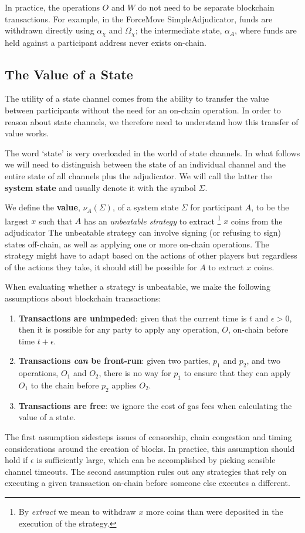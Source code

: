 \documentclass{article}
\begin{document}
In practice, the operations $O$ and $W$ do not need to be separate blockchain transactions.
For example, in the ForceMove SimpleAdjudicator, funds are withdrawn directly using $\alpha_\chi$ and $\Omega_\chi$;
the intermediate state, $\alpha_A$, where funds are held against a participant address never exists on-chain.

\subsection{The Value of a State}\label{section:value-of-a-state}

The utility of a state channel comes from the ability to transfer the value
between participants without the need for an on-chain operation.
In order to reason about state channels, we therefore need to understand how this transfer
of value works.

The word `state' is very overloaded in the world of state channels.
In what follows we will need to distinguish between the state of an individual channel and
the entire state of all channels plus the adjudicator.
We will call the latter the \textbf{system state} and usually denote it with the symbol $\Sigma$.

We define the \textbf{value}, $\nu_A(\Sigma)$, of a system state $\Sigma$ for participant $A$,
to be the largest $x$ such that $A$ has an \textit{unbeatable strategy} to extract
\footnote{By \textit{extract} we mean to withdraw $x$ more coins than were deposited in the execution of the strategy.}
$x$ coins from the adjudicator
The unbeatable strategy can involve signing (or refusing to sign) states off-chain, as well as
applying one or more on-chain operations.
The strategy might have to adapt based on the actions of other players but regardless of
the actions they take, it should still be possible for $A$ to extract $x$ coins.

When evaluating whether a strategy is unbeatable, we make the following assumptions about blockchain transactions:
\begin{enumerate}
  \item \textbf{Transactions are unimpeded}: given that the current time is $t$ and $\epsilon > 0$, then it is possible for any party to apply any operation, $O$, on-chain before time $t + \epsilon$.
  \item \textbf{Transactions \textit{can} be front-run}: given two parties, $p_1$ and $p_2$, and two operations, $O_1$ and $O_2$, there is no way for $p_1$ to ensure that they can apply $O_1$ to the chain before $p_2$ applies $O_2$.
  \item \textbf{Transactions are free}: we ignore the cost of gas fees when calculating the value of a state.
\end{enumerate}
The first assumption sidesteps issues of censorship, chain congestion and timing considerations around the creation of blocks.
In practice, this assumption should hold if $\epsilon$ is sufficiently large, which can be accomplished by picking sensible channel timeouts.
The second assumption rules out any strategies that rely on executing a given transaction on-chain before someone else executes a different.
\end{document}
